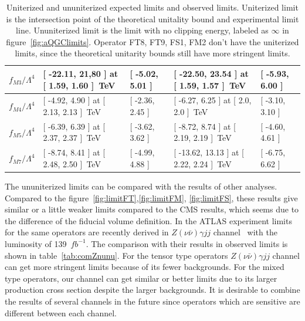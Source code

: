 \begin{table}[ht!]
\begin{center}
{\begin{tabular}{ | l || l | l || l | l | }
$f_{M 3} / \Lambda^4$                &[ -22.11, 21,80 ] at [ 1.59, 1.60 ]~TeV&[ -5.02, 5.01 ]  &[ -22.50, 23.54 ] at [ 1.59, 1.57 ]~TeV &[ -5.93, 6.00 ]\tabularnewline \hline
$f_{M 4} / \Lambda^4$                &[ -4.92, 4.90 ] at [ 2.13, 2.13 ]~TeV & [ -2.36, 2.45 ] &[ -6.27, 6.25 ] at [ 2.0, 2.0 ]~TeV &[ -3.10, 3.10 ]\tabularnewline \hline
$f_{M 5} / \Lambda^4$                &[ -6.39, 6.39 ] at [ 2.37, 2.37 ]~TeV & [ -3.62, 3.62 ] &[ -8.72, 8.74 ] at [ 2.19, 2.19 ]~TeV &[ -4.60, 4.61 ]\tabularnewline \hline
$f_{M 7} / \Lambda^4$                &[ -8.74, 8.41  ] at [ 2.48, 2.50  ]~TeV  & [ -4.99, 4.88 ]   &[ -13.62, 13.13  ] at [ 2.22, 2.24  ]~TeV &[ -6.75, 6.62 ]\tabularnewline \hline
\end{tabular}
}
\caption{Uniterized and ununiterized expected limits and observed limits. Uniterized limit is the intersection point of the theoretical unitality bound and experimental limit line. Ununiterized limit is the limit with no clipping energy, labeled as $\infty$ in figure~\ref{fig:aQGClimits}. Operator FT8, FT9, FS1, FM2 don't have the uniterized limits, since the theoretical unitarity bounds still have more stringent limits.}
\label{tab:aQGClimits}
\end{center}
\end{table}

The ununiterized limits can be compared with the results of other analyses.
Compared to the figure~\ref{fig:limitFT},\ref{fig:limitFM}, \ref{fig:limitFS}, these results give similar or a little weaker limits compared to the CMS results,
which seems due to the difference of the fiducial volume definition.
In the ATLAS experiment limits for the same operators are recently derived in $Z(\nu\bar{\nu})\gamma jj$ channel~\cite{https://doi.org/10.48550/arxiv.2208.12741} with the luminosity of 139~$fb^{-1}$.
The comparison with their results in observed limits is shown in table~\ref{tab:comZnunu}. 
For the tensor type operators $Z(\nu\bar{\nu})\gamma jj$ channel can get more stringent limits because of its fewer backgrounds. 
For the mixed type operators, our channel can get similar or better limits due to its larger production cross section despite the larger backgrounds.
It is desirable to combine the results of several channels in the future since operators which are sensitive are different between each channel.

